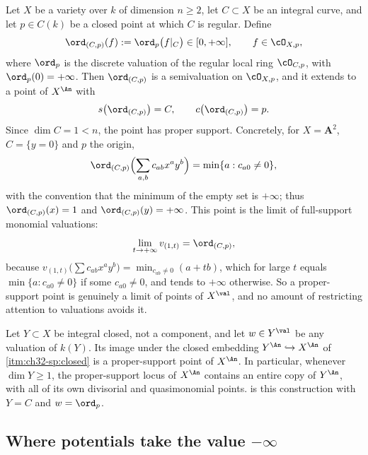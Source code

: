 \begin{example}
\label{ex:ch32-curve-germ}
Let $X$ be a variety over $k$ of dimension $n\geq2$, let
$C\subset X$ be an integral curve, and let $p\in C(k)$ be a closed point
at which $C$ is regular.  Define
\begin{equation}
\label{eq:ch32-curve-germ}
 \ord_{(C,p)}(f):=\ord_p\bigl(f|_C\bigr)\in[0,+\infty],
 \qquad f\in\cO_{X,p},
\end{equation}
where $\ord_p$ is the discrete valuation of the regular local ring
$\cO_{C,p}$, with $\ord_p(0)=+\infty$.  Then $\ord_{(C,p)}$ is a
semivaluation on $\cO_{X,p}$, and it extends to a point of $X^{\An}$
with
\[
 s\bigl(\ord_{(C,p)}\bigr)=C,
 \qquad
 c\bigl(\ord_{(C,p)}\bigr)=p .
\]
Since $\dim C=1<n$, the point has proper support.
Concretely, for $X=\mathbf A^2$, $C=\{y=0\}$ and $p$ the origin,
\[
 \ord_{(C,p)}\Bigl(\sum_{a,b}c_{ab}x^ay^b\Bigr)
 =\min\{a:c_{a0}\neq0\},
\]
with the convention that the minimum of the empty set is $+\infty$; thus
$\ord_{(C,p)}(x)=1$ and $\ord_{(C,p)}(y)=+\infty$.  This point is the
limit of full-support monomial valuations:
\begin{equation}
\label{eq:ch32-curve-germ-limit}
 \lim_{t\to+\infty}v_{(1,t)}=\ord_{(C,p)} ,
\end{equation}
because $v_{(1,t)}\bigl(\sum c_{ab}x^ay^b\bigr)
=\min_{c_{ab}\neq0}(a+tb)$, which for large $t$ equals
$\min\{a:c_{a0}\neq0\}$ if some $c_{a0}\neq0$, and tends to $+\infty$
otherwise.  So a proper-support point is genuinely a limit of points of
$X^{\val}$, and no amount of restricting attention to valuations avoids
it.
\end{example}

\begin{example}
\label{ex:ch32-proper-support-subvariety}
Let $Y\subset X$ be integral closed, not a component, and let
$w\in Y^{\val}$ be any valuation of $k(Y)$.  Its image under the closed
embedding $Y^{\An}\hookrightarrow X^{\An}$ of
\,\cref{itm:ch32-sp:closed} is a
proper-support point of $X^{\An}$.  In particular, whenever
$\dim Y\geq1$, the proper-support locus of $X^{\An}$ contains an entire
copy of $Y^{\An}$, with all of its own divisorial and quasimonomial
points.   is this construction with $Y=C$ and
$w=\ord_p$.
\end{example}

\subsection{Where potentials take the value \texorpdfstring{$-\infty$}{-infinity}}
\label{sec:ch32-minus-infinity}

